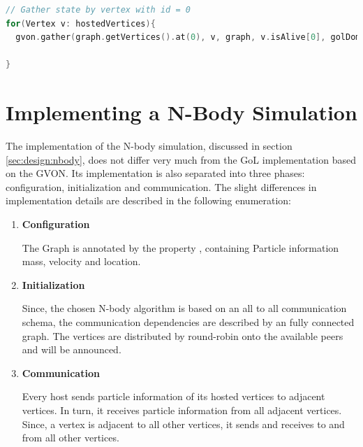 \begin{lstlisting}[language=C++, label=lst:gol_gather, caption={\ } ]
// Gather state by vertex with id = 0
for(Vertex v: hostedVertices){
  gvon.gather(graph.getVertices().at(0), v, graph, v.isAlive[0], golDomain);

}
\end{lstlisting}


\section{Implementing a N-Body Simulation}
\label{sec:impl:nbody}


The implementation of the N-body simulation, discussed in section
\ref{sec:design:nbody}, does not differ very much from the GoL
implementation based on the GVON. Its implementation is also separated
into three phases: configuration, initialization and
communication. The slight differences in implementation details are
described in the following enumeration:

\begin{enumerate}
\item \textbf{Configuration}

  The Graph is annotated by the property
  , containing Particle information mass, velocity and
  location.

\item \textbf{Initialization}

  Since, the chosen N-body algorithm is
  based on an all to all communication schema, the communication
  dependencies are described by an fully connected graph. The vertices
  are distributed by round-robin onto the available peers and will be
  announced.

\item \textbf{Communication}

  Every host sends particle information
  of its hosted vertices to adjacent vertices. In turn, it receives
  particle information from all adjacent vertices. Since, a vertex is
  adjacent to all other vertices, it sends and receives to and from
  all other vertices.
\end{enumerate}

